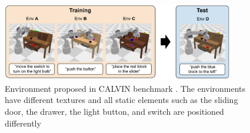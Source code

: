 \begin{figure}[t]
    \centering
    \includegraphics[width=0.9\textwidth]{figures/images/calvin/calvin_env.jpg}
    \caption{Environment proposed in CALVIN benchmark \cite{calvin}. The environments have different textures and all static elements such as the sliding door, the drawer, the light button, and switch are positioned differently}
    \label{fig:calvin_env}
\end{figure}